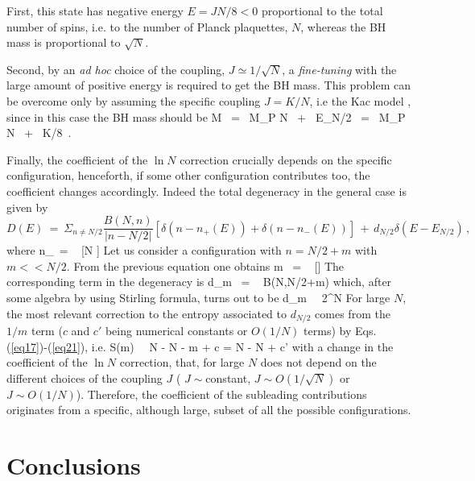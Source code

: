 \documentclass[aps,prd,showkeys,nofootinbib,superscriptaddress]{revtex4-2}
\begin{document}
First, this state has negative energy $E = J N/8 <0$ proportional to the total number of spins, i.e. to the number of Planck plaquettes, $N$, whereas the BH mass is proportional to $\sqrt N$.

Second, by an \textit{ad hoc} choice of the coupling, $J \simeq 1/\sqrt{N}$, a \textit{fine-tuning}  with the large amount of positive energy is required to get the BH mass. This  problem can be overcome only by assuming the specific coupling $J=K/N$, i.e the Kac model \cite{Kac}, since in this case the BH mass should be \cite{Czachor1}
\be \label{eq21}
M \ = \  M_{P} \sqrt N \, + \, E_{N/2} \ = \  M_{P} \sqrt N \, + \, K/8 \,.
\ee

Finally, the coefficient of the $\ln N$ correction crucially depends on the specific configuration, henceforth, if some other configuration contributes too, the coefficient changes accordingly. Indeed the total degeneracy in the general case is given by
\begin{equation}
D(E) \ = \ \Sigma_{n \ne N/2} \frac{B(N,n)}{|n-N/2|} [\delta(n-n_{+}(E))+\delta(n-n_{-}(E))] \, + \, d_{N/2} \delta(E-E_{N/2}) \,,
\end{equation}
where
\be
n_\pm \ = \  [N \pm {}]
\ee
Let us consider a configuration with $n=N/2 + m$ with $m<<N/2$. From the previous equation one obtains
\be
m \ = \  []
\ee
The corresponding term in the degeneracy is
\be
d_m  \ = \  B(N,N/2+m)
\ee
which, after some algebra by using  Stirling formula, turns out to be
\be
d_m \ \simeq \  2^N    
\ee
For large $N$, the most relevant correction to the entropy associated to $d_{N/2}$ comes from the $1/m$ term ($c$ and $c'$ being numerical constants or $O(1/N)$ terms) by Eqs.(\ref{eq17})-(\ref{eq21}), i.e.
\be
S(m) \ \simeq \ N  -  \ln N - \ln m + c =  N  - \ln N + c'
\ee
with a change in the coefficient of the $\ln N$ correction, that, for large $N$ does not depend on the different choices of the coupling $J$ ( $J \sim$constant, $J \sim O(1/\sqrt{N})$ or $J \sim O(1/N)$). Therefore, the coefficient of the subleading contributions originates from a specific, although large, subset of all the possible configurations.

\section{Conclusions}\label{sectionConclusions}
\end{document}
